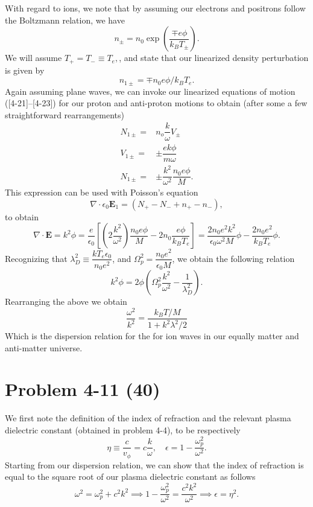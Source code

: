 With regard to ions, we note that by assuming our electrons and positrons follow the Boltzmann relation, we have
\begin{equation*}
	n_\pm = n_0\exp\left(\dfrac{\mp e\phi}{k_BT_\pm} \right).
\end{equation*}
We will assume \(T_+ = T_- \equiv T_e, \), and state that our linearized density perturbation is given by
\begin{equation*}
	n_{1\pm} = \mp n_0 e  \phi /k_BT_e.
\end{equation*}
Again assuming plane waves, we can invoke our linearized equations of motion ([4-21]--[4-23]) for our proton and anti-proton motions to obtain (after some a few straightforward rearrangements)
\begin{align*}
	N_{1\pm} =& n_o\dfrac{k}{\omega}V_{\pm}\\
	V_{1\pm} =& \pm \dfrac{e{k}\phi}{m\omega} \\
	N_{1\pm} =& \pm \dfrac{k^2}{\omega^2}\dfrac{n_0e\phi}{M}.
\end{align*}
This expression can be used with Poisson's equation
\begin{equation*}
	\nabla \cdot \epsilon_0 \bm{E}_1 = \left(N_+ - N_- + n_+ - n_- \right),
\end{equation*}
to obtain
\begin{equation*}
	\nabla \cdot \bm{E} = k^2\phi = \dfrac{e}{\epsilon_0}\left[\left(2\dfrac{k^2}{\omega^2}\right)\dfrac{n_0e\phi}{M} - 2n_0\dfrac{e\phi}{k_BT_e} \right] = \dfrac{2n_0e^2k^2}{\epsilon_0\omega^2M}\phi - \dfrac{2n_0e^2}{k_BT_e}\phi.
\end{equation*}
Recognizing that \(\lambda_D^2 \equiv \dfrac{kT_e\epsilon_0}{n_0e^2} \), and \(\Omega_p^2 = \dfrac{n_0e^2}{\epsilon_0M}\), we obtain the following relation
\begin{equation*}
	k^2\phi = 2\phi\left(\Omega_p^2\dfrac{k^2}{\omega^2} - \dfrac{1}{\lambda_D^2} \right).
\end{equation*}
Rearranging the above we obtain
\begin{equation*}
	\dfrac{\omega^2}{k^2} = \dfrac{k_BT/M}{1 + k^2\lambda^2/2}
\end{equation*}
Which is the dispersion relation for the for ion waves in our equally matter and anti-matter universe.

\section*{Problem 4-11 (40)}
\label{sec:4-11}
We first note the definition of the index of refraction and the relevant plasma dielectric constant (obtained in problem 4-4), to be respectively
\begin{equation*}
	\eta \equiv \dfrac{c}{v_\phi} = c\dfrac{k}{\omega}, \quad \epsilon = 1 - \dfrac{\omega_p^2}{\omega^2}.
\end{equation*}
Starting from our dispersion relation, we can show that the index of refraction is equal to the square root of our plasma dielectric constant as follows
\begin{equation*}
	\omega^2 = \omega_p^2  + c^2k^2 \implies 1-\dfrac{\omega^2_p}{\omega^2} = \dfrac{c^2k^2}{\omega^2} \implies \epsilon = \eta^2.
\end{equation*}

